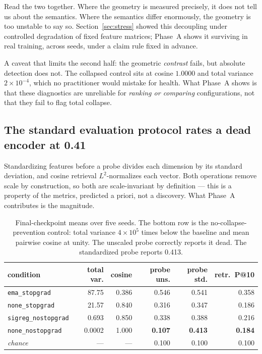 \interp{} Read the two together. Where the geometry is measured precisely, it does not tell
us about the semantics. Where the semantics differ enormously, the geometry is too unstable
to say so. Section~\ref{sec:stress} showed this decoupling under controlled degradation of
fixed feature matrices; Phase~A shows it surviving in real training, across seeds, under a
claim rule fixed in advance.

\ours{} A caveat that limits the second half: the geometric \emph{contrast} fails, but
absolute detection does not. The collapsed control sits at cosine $1.0000$ and total
variance $2\times10^{-4}$, which no practitioner would mistake for health. What Phase~A
shows is that these diagnostics are unreliable for \emph{ranking or comparing}
configurations, not that they fail to flag total collapse.

\subsection{The standard evaluation protocol rates a dead encoder at 0.41}

\established{} Standardizing features before a probe divides each dimension by its standard
deviation, and cosine retrieval $L^2$-normalizes each vector. Both operations remove scale
by construction, so both are scale-invariant by definition --- this is a property of the
metrics, predicted a priori, not a discovery. What Phase~A contributes is the magnitude.

\begin{table}[h]
\centering
\small
\begin{tabular}{l r r r r r}
\toprule
\textbf{condition} & \textbf{total var.} & \textbf{cosine} & \textbf{probe uns.} & \textbf{probe std.} & \textbf{retr.\ P@10} \\
\midrule
\texttt{ema\_stopgrad}      & 87.75   & 0.386 & 0.546 & 0.541 & 0.358 \\
\texttt{none\_stopgrad}     & 21.57   & 0.840 & 0.316 & 0.347 & 0.186 \\
\texttt{sigreg\_nostopgrad} & 0.693   & 0.850 & 0.338 & 0.388 & 0.216 \\
\texttt{none\_nostopgrad}   & 0.0002  & 1.000 & \textbf{0.107} & \textbf{0.413} & \textbf{0.184} \\
\midrule
\emph{chance}               & ---     & ---   & 0.100 & 0.100 & 0.100 \\
\bottomrule
\end{tabular}
\caption{\ours{} Final-checkpoint means over five seeds. The bottom row is the
no-collapse-prevention control: total variance $4\times10^5$ times below the baseline and
mean pairwise cosine at unity. The unscaled probe correctly reports it dead. The
standardized probe reports 0.413.}
\label{tab:blindness}
\end{table}

